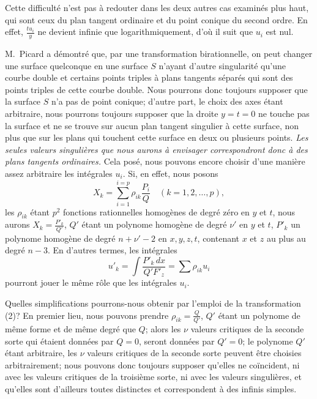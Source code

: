 \documentclass{article}
\begin{document}
Cette difficulté n'est pas à redouter dans les deux autres cas examinés plus haut, qui sont ceux du plan tangent ordinaire et du point conique du second ordre. En effet, $\frac{t u_{i}}{y}$ ne devient infinie que logarithmiquement, d'où il suit que $u_{i}$ est nul.

M.~Picard a démontré que, par une transformation birationnelle, on peut changer une surface quelconque en une surface $S$ n'ayant d'autre singularité qu'une courbe double et certains points triples à plans tangents séparés qui sont des points triples de cette courbe double. Nous pourrons donc toujours supposer que la surface $S$ n'a pas de point conique; d'autre part, le choix des axes étant arbitraire, nous pourrons toujours supposer que la droite $y = t = 0$ ne touche pas la surface et ne se trouve sur aucun plan tangent singulier à cette surface, non plus que sur les plans qui touchent cette surface en deux ou plusieurs points. \emph{Les seules valeurs singulières que nous aurons à envisager correspondront donc à des plans tangents ordinaires.}
Cela posé, nous pouvons encore choisir d'une manière assez arbitraire les intégrales $u_{i}$. Si, en effet, nous posons
\[
X_{k} = \sum_{i=1}^{i=p} \rho_{ik} \frac{P_{i}}{Q} \quad (k = 1, 2, \ldots, p), \tag{2}
\]
les $\rho_{ik}$ étant $p^{2}$ fonctions rationnelles homogènes de degré zéro en $y$ et $t$, nous aurons $X_{k} = \frac{P'_{k}}{Q'}$, $Q'$ étant un polynome homogène de degré $\nu'$ en $y$ et $t$, $P'_{k}$ un polynome homogène de degré $n + \nu' - 2$ en $x, y, z, t$, contenant $x$ et $z$ au plus au degré $n - 3$. En d'autres termes, les intégrales
\[
u'_{k} = \int \frac{P'_{k}\,dx}{Q' F'_{z}} = \sum \rho_{ik} u_{i}
\]
pourront jouer le même rôle que les intégrales $u_{i}$.

Quelles simplifications pourrons-nous obtenir par l'emploi de la transformation (2)? En premier lieu, nous pouvons prendre $\rho_{ik} = \frac{Q}{Q'}$, $Q'$ étant un polynome de même forme et de même degré que $Q$; alors les $\nu$ valeurs critiques de la seconde sorte qui étaient données par $Q = 0$, seront données par $Q' = 0$; le polynome $Q'$ étant arbitraire, les $\nu$ valeurs critiques de la seconde sorte peuvent être choisies arbitrairement; nous pouvons donc toujours supposer qu'elles ne coïncident, ni avec les valeurs critiques de la troisième sorte, ni avec les valeurs singulières, et qu'elles sont d'ailleurs toutes distinctes et correspondent à des infinis simples.
\end{document}
